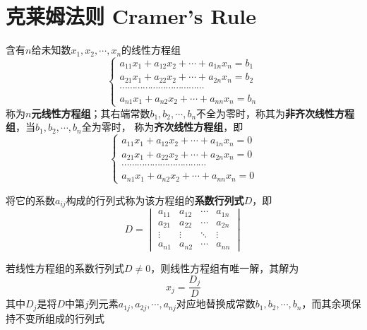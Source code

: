 \documentclass[UTF8]{ctexart}
\begin{document}
\section*{克莱姆法则 Cramer's Rule}
含有$n$给未知数$x_1,x_2,\cdots,x_n$的线性方程组
\[\left\{
\begin{aligned}
a_{11}x_1+a_{12}x_2+\cdots+a_{1n}x_n=b_1\\
a_{21}x_1+a_{22}x_2+\cdots+a_{2n}x_n=b_2\\
\cdots\cdots\cdots\cdots\cdots\cdots\cdots\cdots\cdots\cdots\cdots\\
a_{n1}x_1+a_{n2}x_2+\cdots+a_{nn}x_n=b_n
\end{aligned}
\right.\]
称为\textbf{$n$元线性方程组}；其右端常数$b_1,b_2,\cdots,b_n$不全为零时，称其为\textbf{非齐次线性方程组}，当$b_1,b_2,\cdots,b_n$全为零时，
称为\textbf{齐次线性方程组}，即
\[\left\{
\begin{aligned}
a_{11}x_1+a_{12}x_2+\cdots+a_{1n}x_n=0\\
a_{21}x_1+a_{22}x_2+\cdots+a_{2n}x_n=0\\
\cdots\cdots\cdots\cdots\cdots\cdots\cdots\cdots\cdots\cdots\cdots\\
a_{n1}x_1+a_{n2}x_2+\cdots+a_{nn}x_n=0
\end{aligned}
\right.\]

将它的系数$a_{ij}$构成的行列式称为该方程组的\textbf{系数行列式$D$}，即
\[
D=\begin{vmatrix}
a_{11}&a_{12}&\cdots&a_{1n}\\
a_{21}&a_{22}&\cdots&a_{2n}\\
\vdots&\vdots&\ddots&\vdots\\
a_{n1}&a_{n2}&\cdots&a_{nn}
\end{vmatrix}
\]

若线性方程组的系数行列式$D\ne0$，则线性方程组有唯一解，其解为
\[x_j=\frac{D_j}{D}\]
其中$D_j$是将$D$中第$j$列元素$a_{1j},a_{2j},\cdots,a_{nj}$对应地替换成常数$b_1,b_2,\cdots,b_n$，而其余项保持不变所组成的行列式
\end{document}
